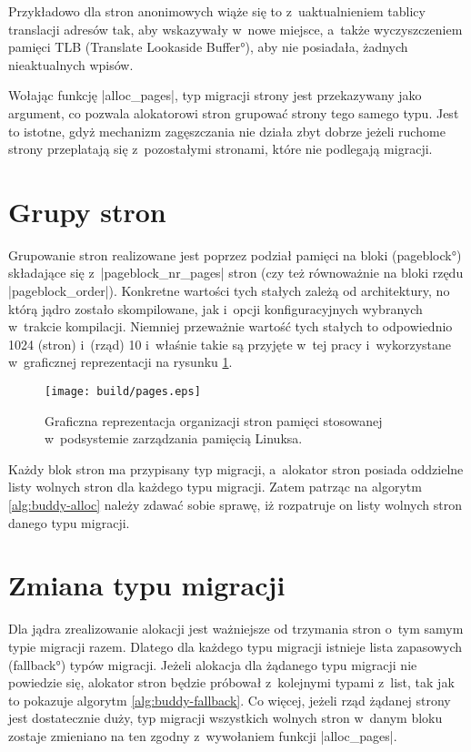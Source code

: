 Przykładowo dla stron anonimowych wiąże się to z~uaktualnieniem
tablicy translacji adresów tak, aby wskazywały w~nowe miejsce, a~także
wyczyszczeniem pamięci TLB (\ang{Translate Lookaside Buffer}), aby nie
posiadała, żadnych nieaktualnych wpisów.

Wołając funkcję \code|alloc_pages|, typ migracji strony jest
przekazywany jako argument, co pozwala alokatorowi stron grupować
strony tego samego typu.  Jest to istotne, gdyż mechanizm zagęszczania
nie działa zbyt dobrze jeżeli ruchome strony przeplatają się
z~pozostałymi stronami, które nie podlegają migracji.


\section{Grupy stron}

Grupowanie stron realizowane jest poprzez podział pamięci na bloki
(\ang{pageblock}) składające się z~\code|pageblock_nr_pages| stron
(czy też równoważnie na bloki rzędu \code|pageblock_order|).
Konkretne wartości tych stałych zależą od architektury, no którą jądro
zostało skompilowane, jak i~opcji konfiguracyjnych wybranych w~trakcie
kompilacji.  Niemniej przeważnie wartość tych stałych to odpowiednio
1024 (stron) i~(rząd) 10 i~właśnie takie są przyjęte w~tej pracy
i~wykorzystane w~graficznej reprezentacji na rysunku \ref{fig:pages}.

\begin{figure}[tbp]
\begin{center}
\texttt{[image: build/pages.eps]}
\end{center}
\caption[Organizacja pamięci w~Linuksie.]{Graficzna reprezentacja
  organizacji stron pamięci stosowanej w~podsystemie zarządzania
  pamięcią Linuksa.}
\label{fig:pages}
\end{figure}

Każdy blok stron ma przypisany typ migracji, a~alokator stron posiada
oddzielne listy wolnych stron dla każdego typu migracji.  Zatem
patrząc na algorytm \ref{alg:buddy-alloc} należy zdawać sobie sprawę,
iż rozpatruje on listy wolnych stron danego typu migracji.

\section{Zmiana typu migracji}\label{sec:type-change}

Dla jądra zrealizowanie alokacji jest ważniejsze od trzymania stron
o~tym samym typie migracji razem.  Dlatego dla każdego typu migracji
istnieje lista zapasowych (\ang{fallback}) typów migracji.  Jeżeli
alokacja dla żądanego typu migracji nie powiedzie się, alokator stron
będzie próbował z~kolejnymi typami z~list, tak jak to pokazuje
algorytm \ref{alg:buddy-fallback}.  Co więcej, jeżeli rząd żądanej
strony jest dostatecznie duży, typ migracji wszystkich wolnych stron
w~danym bloku zostaje zmieniano na ten zgodny z~wywołaniem funkcji
\code|alloc_pages|.

